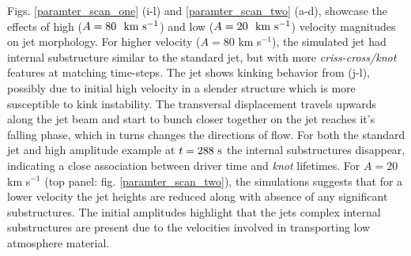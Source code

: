 \documentclass[12pt]{ociamthesis}
\newcommand{\fref}[1]{fig. \ref{#1}}
\newcommand{\kms}{~\rm{km ~s^{-1}}}
\newcommand{\np}{\\ \\}
\begin{document}
Figs. \ref{paramter_scan_one} (i-l) and \ref{paramter_scan_two} (a-d), showcase the effects of high ($A = 80 ~\kms$) and low ($A = 20 ~\kms$) velocity magnitudes on jet morphology. For higher velocity ($A = 80$ km s$^{-1}$), the simulated jet had internal substructure similar to the standard jet, but with more \textit{criss-cross/knot} features at matching time-steps. The jet shows kinking behavior from (j-l), possibly due to initial high velocity in a slender structure which is more susceptible to kink instability. The transversal displacement travels upwards along the jet beam and start to bunch closer together on the jet reaches it's falling phase, which in turns changes the directions of flow. For both the standard jet and high amplitude example at $t = 288 ~\rm{s}$ the internal substructures disappear, indicating a close association between driver time and \textit{knot} lifetimes. For $A = 20$ km s$^{-1}$ (top panel: \fref{paramter_scan_two}), the simulations suggests that for a lower velocity the jet heights are reduced along with absence of any significant substructures. The initial amplitudes highlight that the jets complex internal substructures are present due to the velocities involved in transporting low atmosphere material. \np
\end{document}
